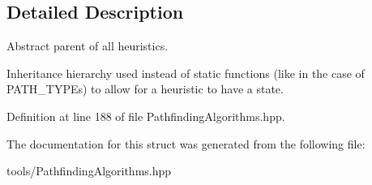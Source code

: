 \subsection{Detailed Description}
Abstract parent of all heuristics. 

Inheritance hierarchy used instead of static functions (like in the case of P\+A\+T\+H\+\_\+\+T\+Y\+P\+Es) to allow for a heuristic to have a state. 

Definition at line 188 of file Pathfinding\+Algorithms.\+hpp.



The documentation for this struct was generated from the following file\+:\begin{DoxyCompactItemize}
\item 
tools/Pathfinding\+Algorithms.\+hpp\end{DoxyCompactItemize}
